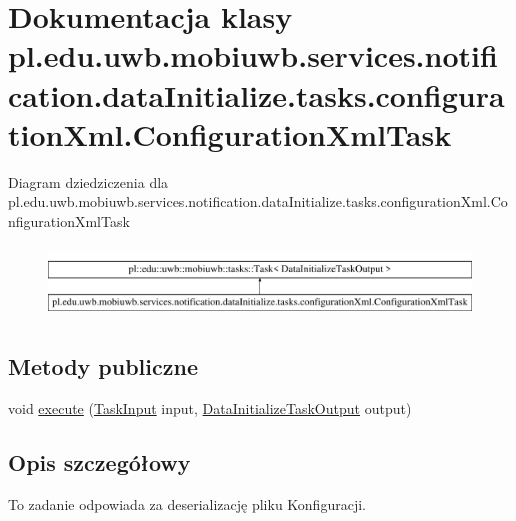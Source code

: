 \hypertarget{classpl_1_1edu_1_1uwb_1_1mobiuwb_1_1services_1_1notification_1_1data_initialize_1_1tasks_1_1conf3c0efff19be36c051c5d2b09cd3e6d08}{}\section{Dokumentacja klasy pl.\+edu.\+uwb.\+mobiuwb.\+services.\+notification.\+data\+Initialize.\+tasks.\+configuration\+Xml.\+Configuration\+Xml\+Task}
\label{classpl_1_1edu_1_1uwb_1_1mobiuwb_1_1services_1_1notification_1_1data_initialize_1_1tasks_1_1conf3c0efff19be36c051c5d2b09cd3e6d08}
Diagram dziedziczenia dla pl.\+edu.\+uwb.\+mobiuwb.\+services.\+notification.\+data\+Initialize.\+tasks.\+configuration\+Xml.\+Configuration\+Xml\+Task\begin{figure}[H]
\begin{center}
\leavevmode
\includegraphics[height=1.921098cm]{classpl_1_1edu_1_1uwb_1_1mobiuwb_1_1services_1_1notification_1_1data_initialize_1_1tasks_1_1conf3c0efff19be36c051c5d2b09cd3e6d08}
\end{center}
\end{figure}
\subsection*{Metody publiczne}
\begin{DoxyCompactItemize}
\item 
void \hyperlink{classpl_1_1edu_1_1uwb_1_1mobiuwb_1_1services_1_1notification_1_1data_initialize_1_1tasks_1_1conf3c0efff19be36c051c5d2b09cd3e6d08_a881644250d5e32be256962b13483de80}{execute} (\hyperlink{classpl_1_1edu_1_1uwb_1_1mobiuwb_1_1tasks_1_1models_1_1_task_input}{Task\+Input} input, \hyperlink{classpl_1_1edu_1_1uwb_1_1mobiuwb_1_1services_1_1notification_1_1data_initialize_1_1_data_initialize_task_output}{Data\+Initialize\+Task\+Output} output)
\end{DoxyCompactItemize}


\subsection{Opis szczegółowy}
To zadanie odpowiada za deserializację pliku Konfiguracji. 

